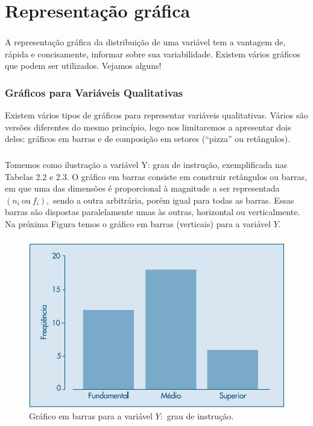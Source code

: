 \documentclass[14pt,aspectratio=1610]{beamer}
\begin{document}
\section{Representação gráfica}
\begin{frame}{}
\frametitle{}
\begin{block}{}
\justifying
A representação gráfica da distribuição de uma variável tem a vantagem de, rápida e concisamente, informar sobre sua variabilidade. Existem vários gráficos que podem ser utilizados. Vejamos alguns!
\end{block}
\end{frame}

\begin{frame}{}
\frametitle{Gráficos para Variáveis Qualitativas}
\begin{block}{}
\justifying
Existem vários tipos de gráficos para representar variáveis qualitativas. Vários são
versões diferentes do mesmo princípio, logo nos limitaremos a apresentar dois deles:
gráficos em barras e de composição em setores (“pizza” ou retângulos).
\end{block}
\end{frame}

\begin{frame}{}
\frametitle{}
\begin{block}{}
\justifying
Tomemos como ilustração a variável Y: grau de instrução, exemplificada
nas Tabelas 2.2 e 2.3. O gráfico em barras consiste em construir retângulos ou barras,
em que uma das dimensões é proporcional à magnitude a ser representada $(n_{i}\ \textrm{ou}\ f_{i}),$ sendo a outra arbitrária, porém igual para todas as barras. Essas barras são dispostas paralelamente umas às outras, horizontal ou verticalmente. Na próxima Figura temos o gráfico em barras (verticais) para a variável $Y.$
\end{block}
\end{frame}

\begin{frame}{}
\frametitle{}
\begin{block}{}
\justifying
\begin{figure}[H]
    \centering
    \includegraphics[scale=0.5]{Fig3}
    \caption{Gráfico em barras para a variável $Y:$ grau de instrução.}
    \label{Fig3_ex}
  \end{figure}
\end{block}
\end{frame}
\end{document}

